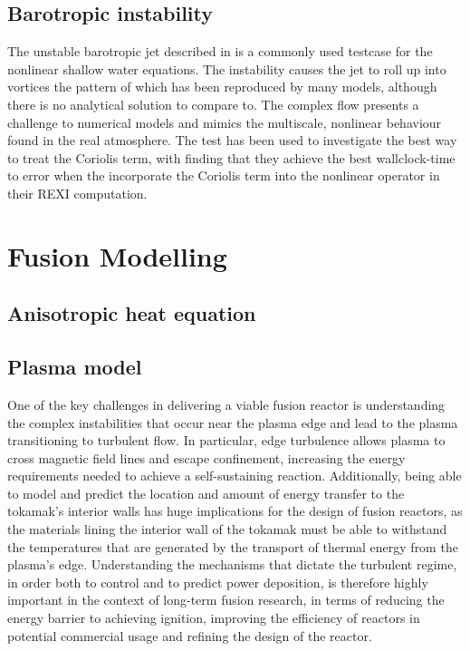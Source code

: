 \documentclass{article}
\begin{document}
\subsection{Barotropic instability}
The unstable barotropic jet described in \citet{galewsky2004initial}
is a commonly used testcase for the nonlinear shallow water
equations. The instability causes the jet to roll up into vortices the
pattern of which has been reproduced by many models, although there is
no analytical solution to compare to. The complex flow presents a
challenge to numerical models and mimics the multiscale, nonlinear
behaviour found in the real atmosphere. The test has been used to
investigate the best way to treat the Coriolis term, with
\citet{schreiber2019exponential} finding that they achieve the best
wallclock-time to error when the incorporate the Coriolis term into
the nonlinear operator in their REXI computation.

\section*{Fusion Modelling}

\subsection{Anisotropic heat equation}

\subsection{Plasma model}

One of the key challenges in delivering a viable fusion reactor is understanding
the complex instabilities that occur near the plasma edge and lead to the plasma
transitioning to turbulent flow. In particular, edge turbulence allows plasma to
cross magnetic field lines and escape confinement, increasing the energy
requirements needed to achieve a self-sustaining reaction. Additionally, being
able to model and predict the location and amount of energy transfer to the
tokamak’s interior walls has huge implications for the design of fusion
reactors, as the materials lining the interior wall of the tokamak must be able
to withstand the temperatures that are generated by the transport of thermal
energy from the plasma’s edge. Understanding the mechanisms that dictate the
turbulent regime, in order both to control and to predict power deposition, is
therefore highly important in the context of long-term fusion research, in terms
of reducing the energy barrier to achieving ignition, improving the efficiency
of reactors in potential commercial usage and refining the design of the
reactor.
\end{document}

